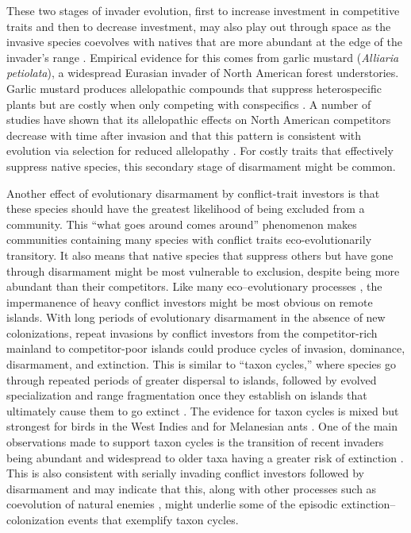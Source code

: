 These two stages of invader evolution, first to increase investment in
competitive traits and then to decrease investment, may also play out
through space as the invasive species coevolves with natives that are
more abundant at the edge of the invader's range \citep{Miller2020,
Thompson2005a}. Empirical evidence for this comes from garlic
mustard (\emph{Alliaria petiolata}), a widespread Eurasian invader of
North American forest understories. Garlic mustard produces allelopathic
compounds that suppress heterospecific plants but are costly when only
competing with conspecifics \citep{Evans2016}. A number of
studies have shown that its allelopathic effects on North American
competitors decrease with time after invasion and that this pattern is
consistent with evolution via selection for reduced allelopathy
\citep{Bossdorf2004, Evans2016, Huang2018, Lankau2009}. For
costly traits that effectively suppress native species, this secondary
stage of disarmament might be common.

Another effect of evolutionary disarmament by conflict-trait investors
is that these species should have the greatest likelihood of being
excluded from a community. This ``what goes around comes around''
phenomenon makes communities containing many species with conflict
traits eco-evolutionarily transitory. It also means that native species 
that suppress others but have gone through disarmament might be most 
vulnerable to exclusion, despite being more abundant than their 
competitors. Like many eco--evolutionary processes
\citep{Losos2009}, the impermanence of heavy conflict investors
might be most obvious on remote islands. With long periods of
evolutionary disarmament in the absence of new colonizations, repeat
invasions by conflict investors from the competitor-rich mainland to
competitor-poor islands could produce cycles of invasion, dominance,
disarmament, and extinction. This is similar to ``taxon cycles,'' where
species go through repeated periods of greater dispersal to islands,
followed by evolved specialization and range fragmentation once they
establish on islands that ultimately cause them to go extinct
\citep{Losos2009, Wilson1961a}. The evidence for taxon cycles is
mixed \citep{Losos1992, Losos1990, Mayr2001, Taper1992} but
strongest for birds in the West Indies \citep{Ricklefs2002} and
for Melanesian ants \citep{Darwell2020, Economo2012,
Wilson1961a}. One of the main observations made to support taxon
cycles is the transition of recent invaders being abundant and
widespread to older taxa having a greater risk of extinction
\citep{Ricklefs2010}. This is also consistent with serially
invading conflict investors followed by disarmament and may indicate
that this, along with other processes such as coevolution of natural
enemies \citep{Ricklefs2002}, might underlie some of the
episodic extinction--colonization events that exemplify taxon cycles.



